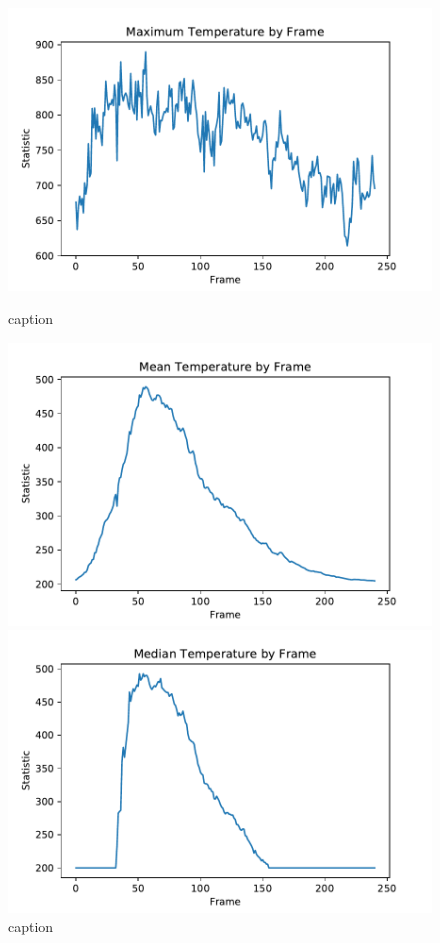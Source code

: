 \documentclass{article}
\begin{document}
\begin{figure}[ht] 
\centering
  \label{ fig7} 
  \begin{minipage}[b]{1\linewidth}
    \centering
    \includegraphics[width=0.8\linewidth]{../plots/f1_maxtemp.pdf} 
    \caption{caption} 
    \vspace{4ex}
  \end{minipage}%
  \begin{minipage}[b]{1\linewidth}
    \centering
    \includegraphics[width=0.8\linewidth]{../plots/f1_meantemp.pdf} 
    \caption{caption} 
    \vspace{4ex}
  \end{minipage} 
  \begin{minipage}[b]{1\linewidth}
    \centering
    \includegraphics[width=0.8\linewidth]{../plots/f1_mediantemp.pdf} 

\end{minipage}
\end{figure}
\end{document}
